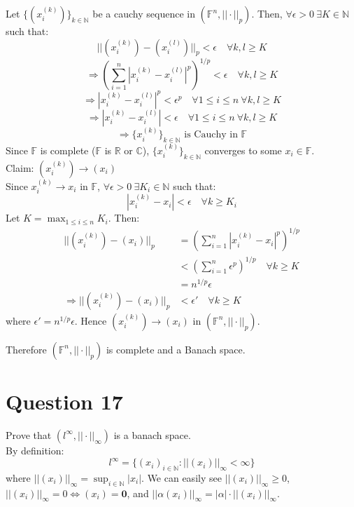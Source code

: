 \documentclass{article}
\begin{document}
	Let $\{(x_i^{(k)})\}_{k \in \mathbb{N}}$ be a cauchy sequence in $(\mathbb{F}^n, ||\cdot||_p)$.
	Then, $\forall \epsilon > 0 ~ \exists K \in \mathbb{N}$ such that:
	\[ ||(x_i^{(k)}) - (x_i^{(l)})||_p < \epsilon \quad \forall k, l \ge K \]
	\[
		\Rightarrow \left(\sum_{i = 1}^n |x_i^{(k)} - x_i^{(l)}|^p\right) ^ {1/p} < \epsilon
		\quad \forall k, l \ge K
	\]
	\[
		\Rightarrow |x_i^{(k)} - x_i^{(l)}|^p < \epsilon^p
		\quad \forall 1 \le i \le n ~ \forall k, l \ge K
	\]
	\[
		\Rightarrow |x_i^{(k)} - x_i^{(l)}| < \epsilon
		\quad \forall 1 \le i \le n ~ \forall k, l \ge K
	\]
	\[ \Rightarrow \{x_i^{(k)}\}_{k \in \mathbb{N}} \text{ is Cauchy in } \mathbb{F} \]
	Since $\mathbb{F}$ is complete ($\mathbb{F}$ is $\mathbb{R}$ or $\mathbb{C}$),
	$\{x_i^{(k)}\}_{k \in \mathbb{N}}$ converges to some $x_i \in \mathbb{F}$. \\
	Claim: $(x_i^{(k)}) \to (x_i)$ \\
	Since $x_i^{(k)} \to x_i$ in $\mathbb{F}$, $\forall \epsilon > 0 ~ \exists K_i \in \mathbb{N}$
	such that:
	\[ |x_i^{(k)} - x_i| < \epsilon \quad \forall k \ge K_i \]
	Let $K = \max_{1 \le i \le n} K_i$.
	Then:
	\begin{align*}
		||(x_i^{(k)}) - (x_i)||_p &= \left(\sum_{i = 1}^n |x_i^{(k)} - x_i|^p\right) ^ {1/p} \\
		&< \left(\sum_{i = 1}^n \epsilon^p\right) ^ {1/p} \quad \forall k \ge K \\
		&= n^{1/p} \epsilon \\
		\Rightarrow ||(x_i^{(k)}) - (x_i)||_p &< \epsilon' \quad \forall k \ge K
	\end{align*}
	where $\epsilon' = n^{1/p} \epsilon$.
	Hence $(x_i^{(k)}) \to (x_i)$ in $(\mathbb{F}^n, ||\cdot||_p)$.

	Therefore $(\mathbb{F}^n, ||\cdot||_p)$ is complete and a Banach space.

\section{Question 17}

	Prove that $(l^\infty, ||\cdot||_\infty)$ is a banach space. \\

	By definition:
	\[ l^\infty = \{(x_i)_{i \in \mathbb{N}}: ||(x_i)||_\infty < \infty\} \]
	where $||(x_i)||_\infty = \sup_{i \in \mathbb{N}} |x_i|$.
	We can easily see $||(x_i)||_\infty \ge 0$, $||(x_i)||_\infty = 0 \Leftrightarrow
	(x_i) = \mathbf{0}$, and $||\alpha (x_i)||_\infty = |\alpha| \cdot ||(x_i)||_\infty$.
\end{document}
